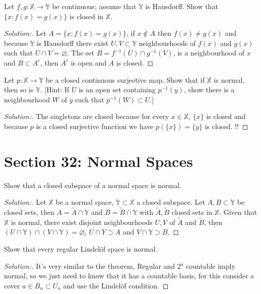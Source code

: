 \documentclass[a4paper,12pt, reqno]{article}
\theoremstyle{definition}
\newenvironment{exerr}[1]{
  \renewcommand\theexeralt{#1}
  \exeralt
}{\endexeralt}
\newenvironment{solution}{\begin{proof}[Solution:]}{\end{proof}}
\newcommand{\X}{\mathbb{X}}
\newcommand{\Y}{\mathbb{Y}}
\begin{document}
\begin{exerr}{5}
  Let $f,g:\X\to\Y$ be continuous; assume that $\Y$ is Hausdorff. Show that $\{ x : f(x) = g(x) \}$ is closed in $\X$.
\end{exerr}
\begin{solution}
  Let $A = \{ x : f(x) = g(x) \}$, if $x\notin A$ then $f(x) \neq g(x)$ and because $\Y$ is Hausdorff there exist $U,V\subset\Y$ neighbourhoods of $f(x)$ and $g(x)$ such that $U\cap V = \varnothing$. The set $B = f^{-1}(U)\cap g^{-1}(V)$, is a neighbourhood of $x$ and $B\subset A^c$, then $A^c$ is open and $A$ is closed.
\end{solution}

\begin{exerr}{6}
  Let $p:\X\to\Y$ be a closed continuous surjective map. Show that if $\X$ is normal, then so is $\Y$. [Hint: If $U$ is an open set containing $p^{-1}(y)$, show there is a neighbourhood $W$ of $y$ such that $p^{-1}(W)\subset U$.]
\end{exerr}
\begin{solution}
  The singletons are closed because for every $x\in\X$, $\{ x \}$ is closed and because $p$ is a closed surjective function we have $p(\{ x \}) = \{ y \}$ is closed. !!
\end{solution}

\section*{Section 32: Normal Spaces}

\begin{exerr}{1}
  Show that a closed subspace of a normal space is normal.
\end{exerr}
\begin{solution}
  Let $\X$ be a normal space, $\Y\subset\X$ a closed subspace. Let $A,B\subset\Y$ be closed sets, then $A = \widetilde{A}\cap\Y$ and $B = \widetilde{B}\cap\Y$ with $\widetilde{A},\widetilde{B}$ closed sets in $\X$. Given that $\X$ is normal, there exist disjoint neighbourhoods $U, V$ of $\widetilde{A}$ and $\widetilde{B}$, then $(U\cap\Y)\cap(V\cap\Y) = \varnothing$, $U\cap Y\supset A$ and $V\cap\Y\supset B$.
\end{solution}

\begin{exerr}{4}
  Show that every regular Lindelöf space is normal.
\end{exerr}
\begin{solution}
  It's very similar to the theorem, Regular and 2° countable imply normal, so we just need to know that it has a countable basis, for this consider a cover $a\in B_{n}\subset U_{n}$ and use the Lindelöf condition.
\end{solution}
\end{document}
